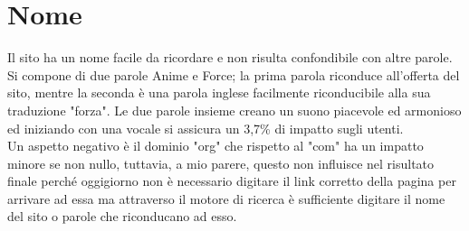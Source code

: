 \section{Nome}
Il sito ha un nome facile da ricordare e non risulta confondibile con altre parole. Si compone di due parole Anime e Force; la prima parola riconduce all'offerta del sito, mentre la seconda è una parola inglese facilmente riconducibile alla sua traduzione "forza". Le due parole insieme creano un suono piacevole ed armonioso ed iniziando con una vocale si assicura un 3,7\% di impatto sugli utenti. \\
Un aspetto negativo è il dominio "org" che rispetto al "com" ha un impatto minore se non nullo, tuttavia, a mio parere, questo non influisce nel risultato finale perché oggigiorno non è necessario digitare il link corretto della pagina per arrivare ad essa ma attraverso il motore di ricerca è sufficiente digitare il nome del sito o parole che riconducano ad esso.  